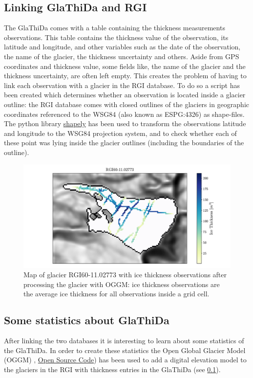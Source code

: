 \subsection{Linking GlaThiDa and RGI}\label{GlaRGI}
The GlaThiDa comes with a table containing the thickness measurements observations. This table contains the thickness value of the observation, its latitude and longitude, and other variables such as the date of the observation, the name of the glacier, the thickness uncertainty and others. Aside from GPS coordinates and thickness value, some fields like, the name of the glacier and the thickness uncertainty, are often left empty. This creates the problem of having to link each observation with a glacier in the RGI database. To do so a script has been created which determines whether an observation is located inside a glacier outline: the RGI database comes with closed outlines of the glaciers in geographic coordinates referenced to the WSG84 (also known as ESPG:4326) as shape-files. The python library \href{https://github.com/Toblerity/Shapely}{shapely} has been used to transform the observations latitude and longitude to the WSG84 projection system, and to check whether each of these point was lying inside the glacier outlines (including the boundaries of the outline).

\begin{figure}\label{fig:thickness-pt} 
	\centering 
	\includegraphics[width=1.0\textwidth]{./figures/glathida_thick_map.pdf}
	\caption{Map of glacier RGI60-11.02773 with ice thickness observations after processing the glacier with OGGM: ice thickness observations are the average ice thickness for all observations inside a grid cell.}
\end{figure}

\subsection{Some statistics about GlaThiDa}\label{glathida-stats}
After linking the two databases it is interesting to learn about some statistics of the GlaThiDa. In order to create these statistics the Open Global Glacier Model (OGGM) \citep{OGGM2019}, \href{https://github.com/OGGM/oggm}{Open Source Code}) has been used to add a digital elevation model to the glaciers in the RGI with thickness entries in the GlaThiDa (see \ref{GlaRGI}).

